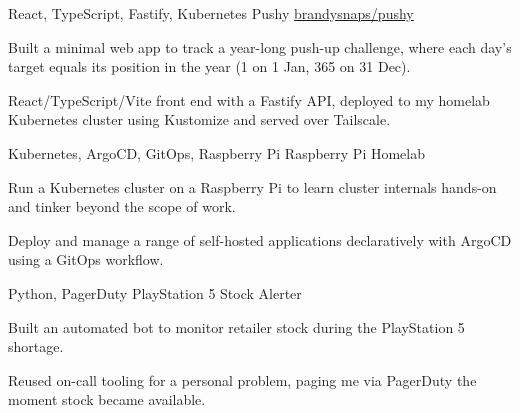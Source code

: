 


\begin{cventries}


\cventry
{React, TypeScript, Fastify, Kubernetes} %
{Pushy} %
{\href{https://github.com/brandysnaps/pushy}{brandysnaps/pushy}} %
{} %
{ %
\begin{cvitems}
\item {Built a minimal web app to track a year-long push-up challenge, where each day's target equals its position in the year (1 on 1 Jan, 365 on 31 Dec).}
\item {React/TypeScript/Vite front end with a Fastify API, deployed to my homelab Kubernetes cluster using Kustomize and served over Tailscale.}
\end{cvitems}
}


\cventry
{Kubernetes, ArgoCD, GitOps, Raspberry Pi} %
{Raspberry Pi Homelab} %
{} %
{} %
{ %
\begin{cvitems}
\item {Run a Kubernetes cluster on a Raspberry Pi to learn cluster internals hands-on and tinker beyond the scope of work.}
\item {Deploy and manage a range of self-hosted applications declaratively with ArgoCD using a GitOps workflow.}
\end{cvitems}
}


\cventry
{Python, PagerDuty} %
{PlayStation 5 Stock Alerter} %
{} %
{} %
{ %
\begin{cvitems}
\item {Built an automated bot to monitor retailer stock during the PlayStation 5 shortage.}
\item {Reused on-call tooling for a personal problem, paging me via PagerDuty the moment stock became available.}
\end{cvitems}
}


\end{cventries}
